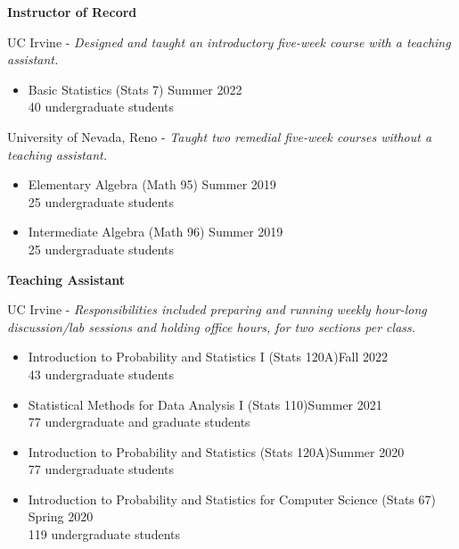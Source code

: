\documentclass{article}
\begin{document}
	
	\begin{description}
		\vspace{-2mm}
		\item[Teaching Experience]\hspace*{.1in} 
		
		\textbf{Instructor of Record}
		
		UC Irvine - \textit{Designed and taught an introductory five-week course with a teaching assistant.}
		\begin{itemize}
			\item Basic Statistics (Stats 7) \hfill{Summer 2022}\\
			40 undergraduate students
		\end{itemize}
		
		University of Nevada, Reno - \textit{Taught two remedial five-week courses without a teaching assistant.}
		\begin{itemize}
			\item Elementary Algebra (Math 95) \hfill{Summer 2019}\\
			25 undergraduate students
			
			\item Intermediate Algebra (Math 96) \hfill{Summer 2019}\\
			25 undergraduate students
		\end{itemize}			
		
		\textbf{Teaching Assistant}
		
		UC Irvine - \textit{Responsibilities included preparing and running weekly hour-long discussion/lab sessions and holding office hours, for two sections per class.}
		\begin{itemize}
			\item Introduction to Probability and Statistics I (Stats 120A)\hfill{Fall 2022}\\
			43 undergraduate students
			
			\item Statistical Methods for Data Analysis I (Stats 110)\hfill{Summer 2021}\\
			77 undergraduate and graduate students %
			
			\item Introduction to Probability and Statistics (Stats 120A)\hfill{Summer 2020}\\
			77 undergraduate students %
			
			\item Introduction to Probability and Statistics for Computer Science (Stats 67) \hfill{Spring 2020}\\
			119 undergraduate students %
			

\end{itemize}
\end{description}
\end{document}
